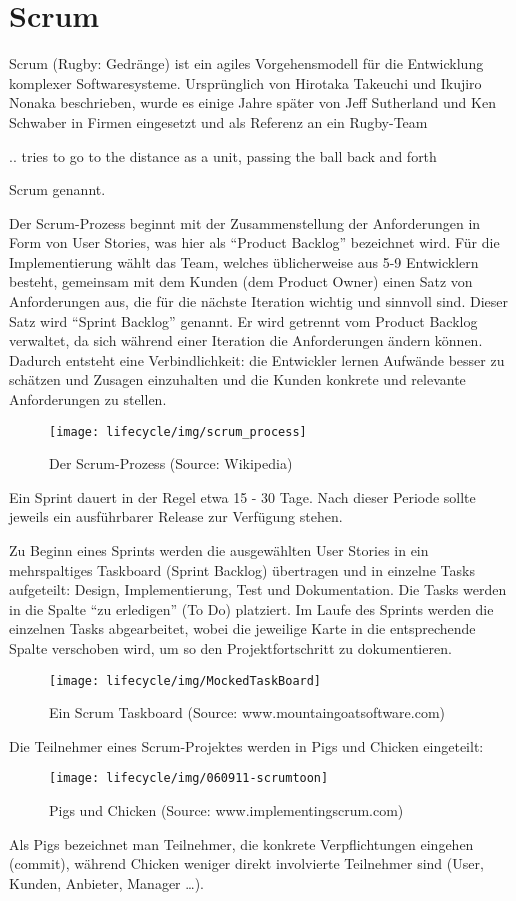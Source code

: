 \begin{minipage}[t]{0.5\linewidth}
\section{Scrum}
Scrum (Rugby: Gedränge) ist ein agiles Vorgehensmodell für die
Entwicklung komplexer Softwaresysteme. Ursprünglich von Hirotaka
Takeuchi und Ikujiro Nonaka beschrieben, wurde es einige Jahre später von
Jeff Sutherland und Ken Schwaber in Firmen eingesetzt und als Referenz
an ein Rugby-Team

.. tries to go to the distance as a unit, passing the ball back and forth

Scrum genannt.

\newslide
Der Scrum-Prozess beginnt mit der Zusammenstellung der Anforderungen
in Form von User Stories,
was hier als ``Product Backlog'' bezeichnet wird. Für die
Implementierung wählt das Team, welches üblicherweise aus 5-9
Entwicklern besteht, gemeinsam mit dem Kunden (dem Product
Owner) einen Satz von Anforderungen aus, die für die nächste Iteration
wichtig und sinnvoll sind. Dieser Satz wird ``Sprint Backlog''
genannt.
Er wird
getrennt vom Product Backlog verwaltet, da sich während einer
Iteration die Anforderungen ändern können. Dadurch entsteht eine
 Verbindlichkeit: die Entwickler lernen Aufwände besser zu
schätzen und Zusagen einzuhalten und die Kunden konkrete und
relevante Anforderungen zu stellen.
\begin{figure}[H]
\begin{center}
\texttt{[image: lifecycle/img/scrum\_process]}
\caption{Der Scrum-Prozess (Source: Wikipedia)}
\end{center}
\end{figure}
Ein Sprint dauert in der Regel etwa 15 - 30 Tage. Nach dieser Periode
sollte jeweils ein ausführbarer Release zur Verfügung stehen.

Zu Beginn eines Sprints werden die ausgewählten User Stories
in ein mehrspaltiges Taskboard (Sprint Backlog)
übertragen und in einzelne Tasks aufgeteilt:
Design, Implementierung, Test und Dokumentation. Die Tasks werden
in die Spalte ``zu erledigen'' (To Do) platziert. Im Laufe des Sprints
werden die einzelnen Tasks abgearbeitet, wobei die jeweilige Karte in
die entsprechende Spalte verschoben wird, um so den Projektfortschritt
zu dokumentieren.
\begin{figure}[H]
\texttt{[image: lifecycle/img/MockedTaskBoard]}
\caption{Ein Scrum Taskboard (Source: www.mountaingoatsoftware.com)}
\end{figure}
Die Teilnehmer eines Scrum-Projektes werden in Pigs und Chicken
eingeteilt:
\begin{figure}[H]
\texttt{[image: lifecycle/img/060911-scrumtoon]}
\caption{Pigs und Chicken (Source: www.implementingscrum.com)}
\end{figure}
Als Pigs bezeichnet man Teilnehmer, die konkrete Verpflichtungen eingehen
(commit), während Chicken weniger direkt involvierte Teilnehmer sind
(User, Kunden, Anbieter, Manager \ldots).


\end{minipage}
